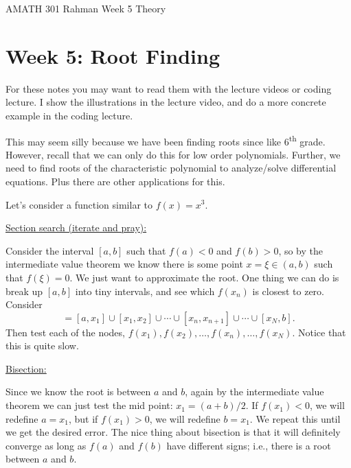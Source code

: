 \documentclass[reqno]{amsart}
\theoremstyle{definition}
\begin{document}
\begin{flushleft}
{\sc \Large AMATH 301 Rahman} \hfill Week 5 Theory
\bigskip
\end{flushleft}

\newcommand{\R}{\mathbb{R}}
\newcommand{\N}{\mathbb{N}}
\newcommand{\Z}{\mathbb{Z}}
\newcommand{\Q}{\mathbb{Q}}
\renewcommand{\CancelColor}{\color{red}}
\newcommand{\?}{\stackrel{?}{=}}
\renewcommand{\varphi}{\phi}
\newcommand{\card}{\text{Card}}
\newcommand{\bigzero}{\text{\Huge 0}}
\newcommand{\curvearrowdown}{{\color{red}\rotatebox{90}{$\curvearrowleft$}}}
\newcommand{\curvearrowup}{{\color{red}\rotatebox{90}{$\curvearrowright$}}}



\section*{Week 5:  Root Finding}

For these notes you may want to read them with the lecture videos or coding lecture.  I show the illustrations in the lecture video, and do a more concrete example in the coding lecture.

This may seem silly because we have been finding roots since like 6\textsuperscript{th} grade.  However, recall that we can only do this for low order polynomials.  Further, we need to find roots of the characteristic polynomial to analyze/solve differential equations.  Plus there are other applications for this.

Let's consider a function similar to $f(x) = x^3$.

\bigskip

\underline{Section search (iterate and pray):  }

Consider the interval $[a, b]$ such that $f(a) < 0$ and $f(b) > 0$, so by the intermediate value theorem we know there is some point $x = \xi \in (a,b)$ such that $f(\xi) = 0$.  We just want to approximate the root.  One thing we can do is break up $[a,b]$ into tiny intervals, and see which $f(x_n)$ is closest to zero.  Consider
%
\begin{equation*}
[a, b] = [a, x_1]\cup [x_1, x_2] \cup \cdots \cup [x_n, x_{n+1}] \cup \cdots \cup [x_{N}, b].
\end{equation*}
%
Then test each of the nodes, $f(x_1), f(x_2), \ldots, f(x_n), \ldots, f(x_N)$.  Notice that this is quite slow.

\bigskip

\underline{Bisection:  }

Since we know the root is between $a$ and $b$, again by the intermediate value theorem we can just test the mid point: $x_1 = (a+b)/2$.  If $f(x_1) < 0$, we will redefine $a = x_1$, but if $f(x_1) > 0$, we will redefine $b = x_1$.  We repeat this until we get the desired error.  The nice thing about bisection is that it will definitely converge as long as $f(a)$ and $f(b)$ have different signs; i.e., there is a root between $a$ and $b$.
\end{document}
